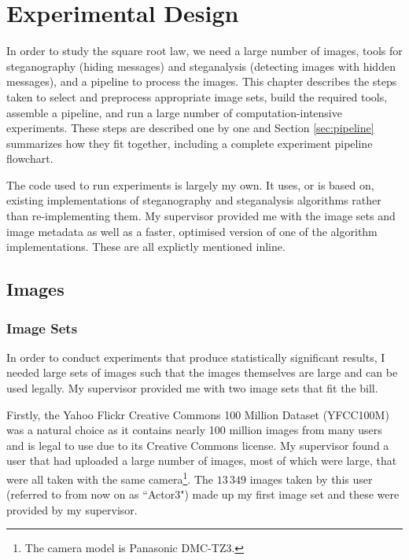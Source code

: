 \documentclass[11pt,a4paper,twoside,openright]{report}
\begin{document}
\chapter{Experimental Design}

In order to study the square root law, we need a large number of images, tools for steganography (hiding messages) and steganalysis (detecting images with hidden messages), and a pipeline to process the images. This chapter describes the steps taken to select and preprocess appropriate image sets, build the required tools, assemble a pipeline, and run a large number of computation-intensive experiments. These steps are described one by one and Section \ref{sec:pipeline} summarizes how they fit together, including a complete experiment pipeline flowchart.

The code used to run experiments is largely my own. It uses, or is based on, existing implementations of steganography and steganalysis algorithms rather than re-implementing them. My supervisor provided me with the image sets and image metadata as well as a faster, optimised version of one of the algorithm implementations. These are all explictly mentioned inline.


\section{Images}


\subsection{Image Sets}
In order to conduct experiments that produce statistically significant results, I needed large sets of images such that the images themselves are large and can be used legally. My supervisor provided me with two image sets that fit the bill.

Firstly, the Yahoo Flickr Creative Commons 100 Million Dataset (YFCC100M) \cite{yfcc100m} was a natural choice as it contains nearly 100 million images from many users and is legal to use due to its Creative Commons license. My supervisor found a user that had uploaded a large number of images, most of which were large, that were all taken with the same camera\footnote{The camera model is Panasonic DMC-TZ3.}. The $13\,349$ images taken by this user (referred to from now on as ``Actor3") made up my first image set and these were provided by my supervisor.
\end{document}
